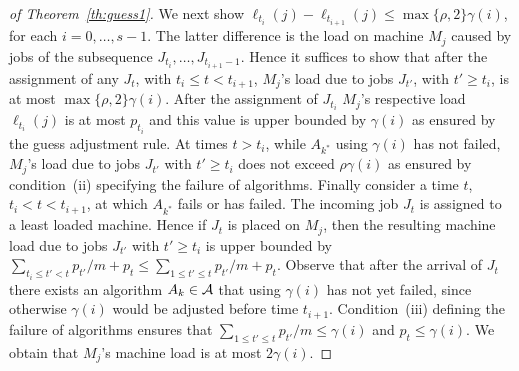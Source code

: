 \documentclass{llncs}
\begin{document}
\begin{proof}[of Theorem~\ref{th:guess1}]
We next show $\ell_{t_{i}}(j) - \ell_{t_{i+1}}(j) \leq \max\{\rho, 2\} \gamma(i)$, for each $i=0,\dots,s-1$. The latter
difference is the load on machine $M_j$ caused by jobs of the subsequence $J_{t_i}, \ldots, J_{t_{i+1}-1}$. Hence it
suffices to show that after the assignment of any $J_t$, with $t_i \leq t < t_{i+1}$, $M_j$'s load due
to jobs $J_{t'}$, with $t'\geq t_i$, is at most $\max\{\rho,2\}\gamma(i)$. After the assignment of $J_{t_i}$
$M_j$'s respective load $\ell_{t_i}(j)$ is at most $p_{t_i}$ and this value is upper bounded by $\gamma(i)$ as ensured by the
guess adjustment rule. At times $t>t_i$, while $A_{k^*}$ using $\gamma(i)$ has not failed, $M_j$'s load
due to jobs $J_{t'}$ with $t'\geq t_i$ does not exceed $\rho\gamma(i)$ as ensured by condition~(ii) specifying
the failure of algorithms. Finally consider a time $t$, $t_i < t <t_{i+1}$, at which $A_{k^*}$
fails or has failed. The incoming job $J_t$ is assigned to a least loaded machine. Hence if $J_t$ is
placed on $M_j$, then the resulting machine load due to jobs $J_{t'}$ with $t'\geq t_i$ is upper bounded by 
$\sum_{t_i\leq t'< t}p_{t'}/m + p_t \leq \sum_{1\leq t'\leq t}p_{t'}/m + p_t$. Observe that after
the arrival of $J_t$ there exists an algorithm $A_k\in {\cal A}$ that using $\gamma(i)$ has not yet
failed, since otherwise $\gamma(i)$ would be adjusted before time $t_{i+1}$. Condition~(iii) defining
the failure of algorithms ensures that $\sum_{1\leq t'\leq t} p_{t'}/m \leq \gamma(i)$ and $p_t\leq \gamma(i)$.
We obtain that $M_j$'s machine load is at most $2\gamma(i)$.


\end{proof}
\end{document}
